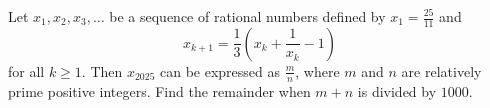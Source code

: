 Let $x_1, x_2, x_3, \ldots$ be a sequence of rational numbers defined by $x_1 = \frac{25}{11}$ and
$$x_{k+1} = \frac{1}{3}\left(x_k + \frac{1}{x_k} - 1\right)$$
for all $k \ge 1$. Then $x_{2025}$ can be expressed as $\frac{m}{n}$, where $m$ and $n$ are relatively prime positive integers. Find the remainder when $m + n$ is divided by $1000$.